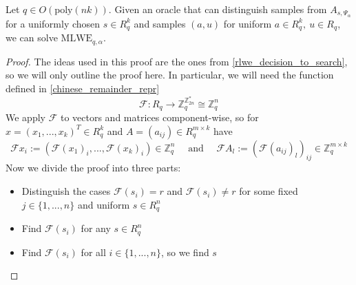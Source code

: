 \documentclass{report}
\newcommand{\Z}{\mathbb{Z}}
\newcommand{\poly}{\text{poly}}
\begin{document}
Let $q \in O(\poly(nk))$. Given an oracle that can distinguish samples from $A_{s, \Psi_\alpha}$ for a uniformly chosen $s \in R_q^k$ and samples $(a, u)$ for uniform $a \in R_q^k,\ u \in R_q$, we can solve $\mathrm{MLWE}_{q, \alpha}$.

\begin{proof}
The ideas used in this proof are the ones from \ref{rlwe_decision_to_search}, so we will only outline the proof here. In particular, we will need the function defined in \ref{chinese_remainder_repr}
\begin{equation}
\mathcal{F}: R_q \to \Z_q^{\Z_{2n}^*} \cong \Z_q^n \nonumber
\end{equation}
We apply $\mathcal{F}$ to vectors and matrices component-wise, so for $x = (x_1, ..., x_k)^T \in R_q^k$ and $A = (a_{ij}) \in R_q^{m \times k}$ have
\begin{equation}
\mathcal{F}x_i := \left(\mathcal{F}(x_1)_i, ..., \mathcal{F}(x_k)_i\right) \in \Z_q^n \quad \text{ and } \quad \mathcal{F}A_l := \left(\mathcal{F}\left(a_{ij}\right)_l\right)_{ij} \in \Z_q^{m \times k} \nonumber
\end{equation}
Now we divide the proof into three parts:
\begin{itemize}
\item Distinguish the cases $\mathcal{F}(s_i) = r$ and $\mathcal{F}(s_i) \neq r$ for some fixed $j \in \{ 1, ..., n \}$ and uniform $s \in R_q^n$
\item Find $\mathcal{F}(s_i)$ for any $s \in R_q^n$
\item Find $\mathcal{F}(s_i)$ for all $i \in \{ 1, ..., n \}$, so we find $s$
\end{itemize}


\end{proof}
\end{document}
